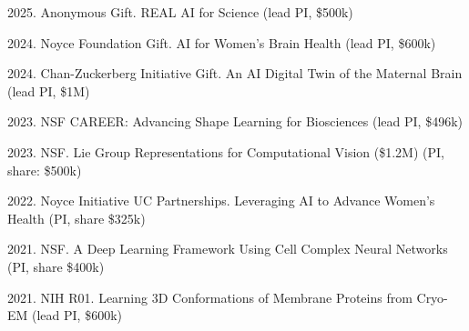 2025. Anonymous Gift. REAL AI for Science \hfill (lead PI, \$500k) 

2024. Noyce Foundation Gift. AI for Women's Brain Health \hfill (lead PI, \$600k) 

2024. Chan-Zuckerberg Initiative Gift. An AI Digital Twin of the Maternal Brain \hfill (lead PI, \$1M) 

2023. NSF CAREER: Advancing Shape Learning for Biosciences \hfill (lead PI, \$496k) 

2023. NSF. Lie Group Representations for Computational Vision (\$1.2M) \hfill (PI, share: \$500k) 

2022. Noyce Initiative UC Partnerships. Leveraging AI to Advance Women’s Health \hfill (PI, share \$325k)

2021. NSF. A Deep Learning Framework Using Cell Complex Neural Networks \hfill (PI, share \$400k)

2021. NIH R01. Learning 3D Conformations of Membrane Proteins from Cryo-EM \hfill (lead PI, \$600k) 
